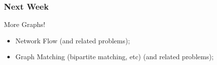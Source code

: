 \documentclass{beamer}
\begin{document}
\begin{frame}
  \frametitle{Next Week}
  More Graphs!
  \begin{itemize}
  \item Network Flow (and related problems);
  \item Graph Matching (bipartite matching, etc) (and related problems);
  \end{itemize}
\end{frame}

\end{document}
